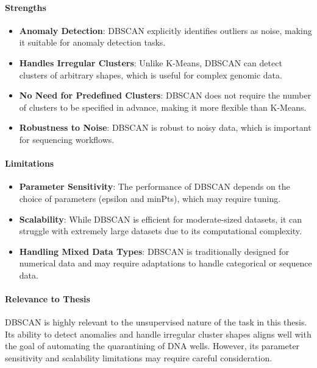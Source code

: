 \paragraph{Strengths}
\begin{itemize}
\item \textbf{Anomaly Detection}: DBSCAN explicitly identifies outliers as noise, making it suitable for anomaly detection tasks.
\item \textbf{Handles Irregular Clusters}: Unlike K-Means, DBSCAN can detect clusters of arbitrary shapes, which is useful for complex genomic data.
\item \textbf{No Need for Predefined Clusters}: DBSCAN does not require the number of clusters to be specified in advance, making it more flexible than K-Means.
\item \textbf{Robustness to Noise}: DBSCAN is robust to noisy data, which is important for sequencing workflows.
\end{itemize}

\paragraph{Limitations}
\begin{itemize}
\item \textbf{Parameter Sensitivity}: The performance of DBSCAN depends on the choice of parameters (epsilon and minPts), which may require tuning.
\item \textbf{Scalability}: While DBSCAN is efficient for moderate-sized datasets, it can struggle with extremely large datasets due to its computational complexity.
\item \textbf{Handling Mixed Data Types}: DBSCAN is traditionally designed for numerical data and may require adaptations to handle categorical or sequence data.
\end{itemize}

\paragraph{Relevance to Thesis}
DBSCAN is highly relevant to the unsupervised nature of the task in this thesis. Its ability to detect anomalies and handle irregular cluster shapes aligns well with the goal of automating the quarantining of DNA wells. However, its parameter sensitivity and scalability limitations may require careful consideration.


